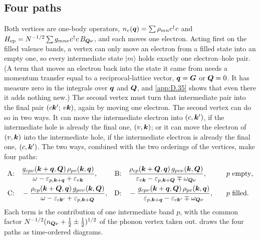 \subsection{Four paths}

Both vertices are one-body operators, $n_e(\bm{q}) = \sum\rho_{mn}c^\dagger c$ and $H_{\mathrm{ep}} = N^{-1/2}\sum g_{mn\nu}c^\dagger c\,B_{\bm{Q}\nu}$, and each moves one electron. Acting first on the filled valence bands, a vertex can only move an electron from a filled state into an empty one, so every intermediate state $|m\rangle$ holds exactly one electron--hole pair. (A term that moves an electron back into the state it came from needs a momentum transfer equal to a reciprocal-lattice vector, $\bm{q} = \bm{G}$ or $\bm{Q} = 0$. It has measure zero in the integrals over $\bm{q}$ and $\bm{Q}$, and \cref{app:D.35} shows that even there it adds nothing new.) The second vertex must turn that intermediate pair into the final pair $(c\bm{k}';\,v\bm{k})$, again by moving one electron. The second vertex can do so in two ways. It can move the intermediate electron into $(c,\bm{k}')$, if the intermediate hole is already the final one, $(v,\bm{k})$; or it can move the electron of $(v,\bm{k})$ into the intermediate hole, if the intermediate electron is already the final one, $(c,\bm{k}')$. The two ways, combined with the two orderings of the vertices, make four paths:
\begin{equation}
  \begin{aligned}
  \text{A:}&\quad \frac{g_{cp\nu}(\bm{k}+\bm{q},\bm{Q})\,\rho_{pv}(\bm{k},\bm{q})}{\omega - \varepsilon_{p,\bm{k}+\bm{q}} + \varepsilon_{v\bm{k}}} ,
  &\text{B:}&\quad \frac{\rho_{cp}(\bm{k}+\bm{Q},\bm{q})\,g_{pv\nu}(\bm{k},\bm{Q})}{\varepsilon_{v\bm{k}} - \varepsilon_{p,\bm{k}+\bm{Q}} \mp \omega_{\bm{Q}\nu}} , &&\quad p\ \text{empty}, \\
  \text{C:}&\quad -\frac{\rho_{cp}(\bm{k}+\bm{Q},\bm{q})\,g_{pv\nu}(\bm{k},\bm{Q})}{\omega - \varepsilon_{c\bm{k}'} + \varepsilon_{p,\bm{k}+\bm{Q}}} ,
  &\text{D:}&\quad -\frac{g_{cp\nu}(\bm{k}+\bm{q},\bm{Q})\,\rho_{pv}(\bm{k},\bm{q})}{\varepsilon_{p,\bm{k}+\bm{q}} - \varepsilon_{c\bm{k}'} \mp \omega_{\bm{Q}\nu}} , &&\quad p\ \text{filled}.
  \end{aligned}
  \label{eq:13.2-paths}
\end{equation}
Each term is the contribution of one intermediate band $p$, with the common factor $N^{-1/2}(n_{\bm{Q}\nu} + \frac12 \pm \frac12)^{1/2}$ of the phonon vertex taken out.  draws the four paths as time-ordered diagrams.

